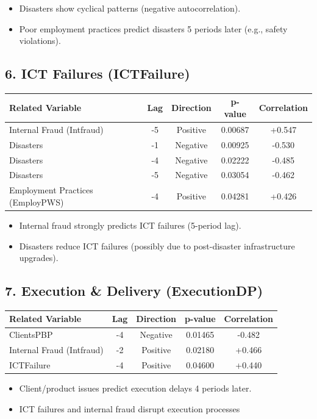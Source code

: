 \begin{itemize}
\item Disasters show cyclical patterns (negative autocorrelation).
\item Poor employment practices predict disasters 5 periods later (e.g., safety violations).
\end{itemize}

\subsection*{6. ICT Failures (ICTFailure)}
\begin{tabular}{lcccc}
\toprule
Related Variable & Lag & Direction & p-value & Correlation \\
\midrule
Internal Fraud (Intfraud) & -5 & Positive & 0.00687 & +0.547 \\
Disasters & -1 & Negative & 0.00925 & -0.530 \\
Disasters & -4 & Negative & 0.02222 & -0.485 \\
Disasters & -5 & Negative & 0.03054 & -0.462 \\
Employment Practices (EmployPWS) & -4 & Positive & 0.04281 & +0.426 \\
\bottomrule
\end{tabular}

\begin{itemize}
\item Internal fraud strongly predicts ICT failures (5-period lag).
\item Disasters reduce ICT failures (possibly due to post-disaster infrastructure upgrades).
\end{itemize}

\subsection*{7. Execution \& Delivery (ExecutionDP)}
\begin{tabular}{lcccc}
\toprule
Related Variable & Lag & Direction & p-value & Correlation \\
\midrule
ClientsPBP & -4 & Negative & 0.01465 & -0.482 \\
Internal Fraud (Intfraud) & -2 & Positive & 0.02180 & +0.466 \\
ICTFailure & -4 & Positive & 0.04600 & +0.440 \\
\bottomrule
\end{tabular}

\begin{itemize}
\item Client/product issues predict execution delays 4 periods later.
\item ICT failures and internal fraud disrupt execution processes
\end{itemize}

